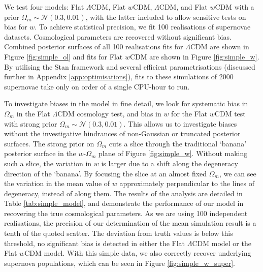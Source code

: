 \documentclass[a4paper,fleqn,usenatbib,manuscript]{emulateapj}
\begin{document}
We test four models: Flat $\Lambda$CDM, Flat $w$CDM, $\Lambda$CDM, and Flat $w$CDM with a prior $\Omega_m \sim \mathcal{N}(0.3, 0.01)$, with the latter included to allow sensitive tests on bias for $w$. To achieve statistical precision, we fit 100 realisations of supernovae datasets. Cosmological parameters are recovered without significant bias. Combined posterior surfaces of all 100 realisations fits for $\Lambda$CDM are shown in Figure \ref{fig:simple_ol} and fits for Flat $w$CDM are shown in Figure \ref{fig:simple_w}. By utilising the Stan framework and several efficient parametrisations (discussed further in Appendix \ref{app:optimisations}), fits to these simulations of 2000 supernovae take only on order of a single CPU-hour to run.

To investigate biases in the model in fine detail, we look for systematic bias in $\Omega_m$ in the Flat $\Lambda$CDM cosmology test, and bias in $w$ for the Flat $w$CDM test with strong prior $\Omega_m \sim \mathcal{N}(0.3, 0.01)$. This allows us to investigate biases without the investigative hindrances of non-Gaussian or truncated posterior surfaces. The strong prior on $\Omega_m$ cuts a slice through the traditional `banana' posterior surface in the $w$-$\Omega_m$ plane of Figure \ref{fig:simple_w}. Without making such a slice, the variation in $w$ is larger due to a shift along the degeneracy direction of the `banana'. By focusing the slice at an almost fixed $\Omega_m$, we can see the variation in the mean value of $w$ approximately perpendicular to the lines of degeneracy, instead of along them. The results of the analysis are detailed in Table \ref{tab:simple_model}, and demonstrate the performance of our model in recovering the true cosmological parameters.  As we are using 100 independent realisations, the precision of our determination of the mean simulation result is a tenth of the quoted scatter. The deviation from truth values is below this threshold, no significant bias is detected in either the Flat $\Lambda$CDM model or the Flat $w$CDM model. With this simple data, we also correctly recover underlying supernova populations, which can be seen in Figure \ref{fig:simple_w_super}.
\end{document}
